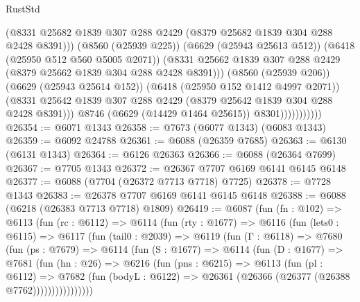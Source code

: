 \begin{lexlean}{RustStd}
\begin{coremodule}
                                (@8331
                                  @25682
                                  @1839
                                  @307
                                  @288
                                  @2429
                                  (@8379 @25682 @1839 @304 @288 @2428 @8391)))
                              (@8560 (@25939 @225))
                              (@6629 (@25943 @25613 @512))
                              (@6418 (@25950 @512 @560 @5005 @2071))
                              (@8331
                                @25662
                                @1839
                                @307
                                @288
                                @2429
                                (@8379 @25662 @1839 @304 @288 @2428 @8391)))
                            (@8560 (@25939 @206))
                            (@6629 (@25943 @25614 @152))
                            (@6418 (@25950 @152 @1412 @4997 @2071))
                            (@8331
                              @25642
                              @1839
                              @307
                              @288
                              @2429
                              (@8379 @25642 @1839 @304 @288 @2428 @8391)))
                          @8746
                          (@6629 (@14429 @1464 @25615))
                          @8301)))))))))))
@26354 := @6071 @1343
@26358 := @7673 (@6077 @1343) (@6083 @1343)
@26359 := @6092 @24788
@26361 := @6088 (@26359 @7685)
@26363 := @6130 (@6131 @1343)
@26364 := @6126 @26363
@26366 := @6088 (@26364 @7699)
@26367 := @7705 @1343
@26372 := @26367 @7707 @6169 @6141 @6145 @6148
@26377 := @6088 (@7704 (@26372 @7713 @7718) @7725)
@26378 := @7728 @1343
@26383 := @26378 @7707 @6169 @6141 @6145 @6148
@26388 := @6088 (@6218 (@26383 @7713 @7718) @1809)
@26419 := @6087
    (fun (fn : @102) =>
    @6113
      (fun (rc : @6112) =>
      @6114
        (fun (rty : @1677) =>
        @6116
          (fun (lets0 : @6115) =>
          @6117
            (fun (tail0 : @2039) =>
            @6119
              (fun (Γ : @6118) =>
              @7680
                (fun (ps : @7679) =>
                @6114
                  (fun (S : @1677) =>
                  @6114
                    (fun (D : @1677) =>
                    @7681
                      (fun (hn : @26) =>
                      @6216
                        (fun (pns : @6215) =>
                        @6113
                          (fun (pl : @6112) =>
                          @7682
                            (fun (bodyL : @6122) =>
                            @26361 (@26366 (@26377 (@26388 @7762))))))))))))))))

\end{coremodule}
\end{lexlean}
